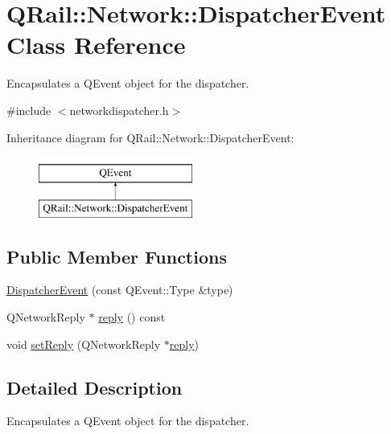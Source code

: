 \hypertarget{classQRail_1_1Network_1_1DispatcherEvent}{}\section{Q\+Rail\+::Network\+::Dispatcher\+Event Class Reference}
\label{classQRail_1_1Network_1_1DispatcherEvent}


Encapsulates a Q\+Event object for the dispatcher.  




{\ttfamily \#include $<$networkdispatcher.\+h$>$}

Inheritance diagram for Q\+Rail\+::Network\+::Dispatcher\+Event\+:\begin{figure}[H]
\begin{center}
\leavevmode
\includegraphics[height=2.000000cm]{classQRail_1_1Network_1_1DispatcherEvent}
\end{center}
\end{figure}
\subsection*{Public Member Functions}
\begin{DoxyCompactItemize}
\item 
\mbox{\hyperlink{classQRail_1_1Network_1_1DispatcherEvent_a4d9e47422ab14e73bd89f184e562d7d2}{Dispatcher\+Event}} (const Q\+Event\+::\+Type \&type)
\item 
Q\+Network\+Reply $\ast$ \mbox{\hyperlink{classQRail_1_1Network_1_1DispatcherEvent_a94a75385c15aca824628940d13124f2f}{reply}} () const
\item 
void \mbox{\hyperlink{classQRail_1_1Network_1_1DispatcherEvent_a68639e6a5ee34d8c8e6bb418d8c006e5}{set\+Reply}} (Q\+Network\+Reply $\ast$\mbox{\hyperlink{classQRail_1_1Network_1_1DispatcherEvent_a94a75385c15aca824628940d13124f2f}{reply}})
\end{DoxyCompactItemize}


\subsection{Detailed Description}
Encapsulates a Q\+Event object for the dispatcher. 


